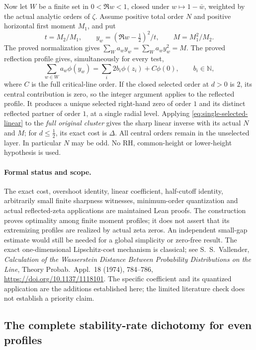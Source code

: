 Now let \(W\) be a finite set in \(0<\Re w<1\), closed under
\(w\mapsto1-\bar w\), weighted by the actual analytic orders of
\(\zeta\).  Assume positive total order \(N\) and positive horizontal
first moment \(M_1\), and put
\[
 t=M_2/M_1,\qquad y_w=(\Re w-\tfrac12)^2/t,\qquad
 M=M_1^2/M_2.
\]
The proved normalization gives
\(\sum_W a_wy_w=\sum_Wa_wy_w^2=M\).
The proved reflection profile gives, simultaneously for every test,
\[
 \sum_{w\in W}a_w\phi(y_w)
   =\sum_i2b_i\phi(z_i)+C\phi(0),
 \qquad b_i\in\mathbb N,
\]
where \(C\) is the full critical-line order.
If the closed selected order at \(d>0\) is \(2\), its central
contribution is zero, so the integer argument applies to the reflected
profile.  It produces a unique selected right-hand zero of order \(1\)
and its distinct reflected partner of order \(1\), at a single radial
level.  Applying \eqref{eq:single-selected-linear} to the
\emph{full original cluster} gives the sharp linear inverse with its
actual \(N\) and \(M\); for \(d\leq\tfrac12\), its exact cost is
\(\Delta\).  All central orders remain in the unselected layer.
In particular \(N\) may be odd.  No RH, common-height or lower-height
hypothesis is used.

\paragraph{Formal status and scope.}
The exact cost, overshoot identity, linear coefficient, half-cutoff
identity, arbitrarily small finite sharpness witnesses, minimum-order
quantization and actual reflected-zeta applications are maintained
Lean proofs.  The construction proves optimality among finite
moment profiles; it does not assert that its extremizing profiles
are realized by actual zeta zeros.  An independent small-gap estimate
would still be needed for a global simplicity or zero-free result.
The exact one-dimensional Lipschitz-cost mechanism is classical;
see S.~S.~Vallender, \emph{Calculation of the Wasserstein Distance
Between Probability Distributions on the Line},
Theory Probab.\ Appl.\ 18 (1974), 784--786,
\url{https://doi.org/10.1137/1118101}.
The specific coefficient and its quantized application are the
additions established here; the limited literature check does not
establish a priority claim.

\subsection{The complete stability-rate dichotomy for even profiles}
\label{subsec:even-threshold-rate-dichotomy}

